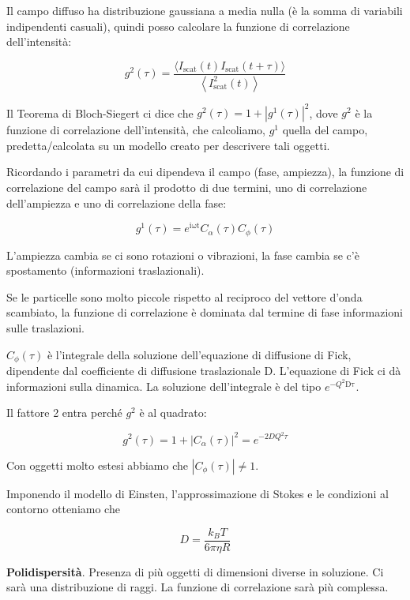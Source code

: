 Il campo diffuso ha distribuzione gaussiana a media nulla (è la somma di
variabili indipendenti casuali), quindi posso calcolare la funzione di
correlazione dell'intensità:

\[g^{2}\left( \tau \right) = \frac{\langle I_{\text{scat}}\left( t \right)I_{\text{scat}}(t + \tau)\rangle}{\left\langle I_{\text{scat}}^{2}\left( t \right) \right\rangle}\]

Il Teorema di Bloch-Siegert ci dice che
\(g^{2}\left( \tau \right) = 1 + \left| g^{1}\left( \tau \right) \right|^{2}\),
dove \(g^{2}\) è la funzione di correlazione dell'intensità, che
calcoliamo, \(g^{1}\) quella del campo, predetta/calcolata su un modello
creato per descrivere tali oggetti.

Ricordando i parametri da cui dipendeva il campo (fase, ampiezza), la
funzione di correlazione del campo sarà il prodotto di due termini, uno
di correlazione dell'ampiezza e uno di correlazione della fase:

\[g^{1}\left( \tau \right) = e^{\text{iωt}}C_{\alpha}\left( \tau \right)C_{\phi}(\tau)\]

L'ampiezza cambia se ci sono rotazioni o vibrazioni, la fase cambia se
c'è spostamento (informazioni traslazionali).

Se le particelle sono molto piccole rispetto al reciproco del vettore
d'onda scambiato, la funzione di correlazione è dominata dal termine di
fase informazioni sulle traslazioni.

\(C_{\phi}(\tau)\) è l'integrale della soluzione dell'equazione di
diffusione di Fick, dipendente dal coefficiente di diffusione
traslazionale D. L'equazione di Fick ci dà informazioni sulla dinamica.
La soluzione dell'integrale è del tipo \(e^{- Q^{2}\text{Dτ}}\).

Il fattore 2 entra perché \(g^{2}\) è al quadrato:

\[g^{2}\left( \tau \right) = 1 + \left| C_{\alpha}\left( \tau \right) \right|^{2} = e^{- 2DQ^{2}\tau}\]

Con oggetti molto estesi abbiamo che
\(\left| C_{\phi}\left( \tau \right) \right| \neq 1\).

Imponendo il modello di Einsten, l'approssimazione di Stokes e le
condizioni al contorno otteniamo che

\[D = \frac{k_{B}T}{6\pi\eta R}\]

\textbf{Polidispersità}. Presenza di più oggetti di dimensioni diverse
in soluzione. Ci sarà una distribuzione di raggi. La funzione di
correlazione sarà più complessa.

